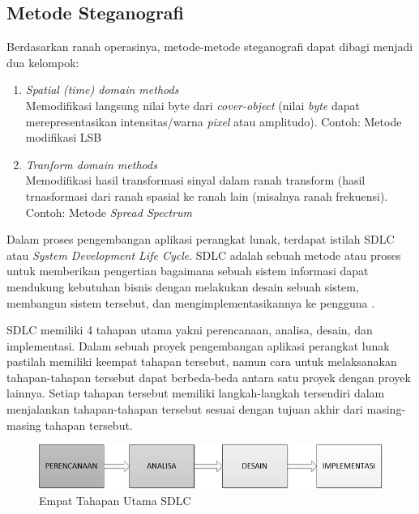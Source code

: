 	\subsection{Metode Steganografi}
	Berdasarkan ranah operasinya, metode-metode steganografi dapat dibagi menjadi dua kelompok:
	\begin{enumerate}
		\item \emph{Spatial (time) domain methods}\\
		Memodifikasi langsung nilai byte dari \emph{cover-object} (nilai \emph{byte} dapat merepresentasikan intensitas/warna \emph{pixel} atau amplitudo). Contoh: Metode modifikasi LSB
		
		\item \emph{Tranform domain methods}\\
		Memodifikasi hasil transformasi sinyal dalam ranah transform (hasil trnasformasi dari ranah spasial ke ranah lain (misalnya ranah frekuensi). Contoh: Metode \emph{Spread Spectrum} \cite{munir}
		
	\end{enumerate}

	Dalam proses pengembangan aplikasi perangkat lunak, terdapat istilah SDLC atau \emph{System Development Life Cycle}. SDLC adalah sebuah metode atau proses untuk memberikan pengertian bagaimana sebuah sistem informasi dapat mendukung kebutuhan bisnis dengan melakukan desain sebuah sistem, membangun sistem tersebut, dan mengimplementasikannya ke pengguna \cite{denis}.
	
	SDLC memiliki 4 tahapan utama yakni perencanaan, analisa, desain, dan implementasi. Dalam sebuah proyek pengembangan aplikasi perangkat lunak pastilah memiliki keempat tahapan tersebut, namun cara untuk melaksanakan tahapan-tahapan tersebut dapat berbeda-beda antara satu proyek dengan proyek lainnya. Setiap tahapan tersebut memiliki langkah-langkah tersendiri dalam menjalankan tahapan-tahapan tersebut sesuai dengan tujuan akhir dari masing-masing tahapan tersebut.
	
	\begin{figure}[H]
		\centering
		\includegraphics[width=1\textwidth]{gambar/sdlc_overview}
		\caption{Empat Tahapan Utama SDLC}
		\label{sdlc_overview}
	\end{figure}
		

